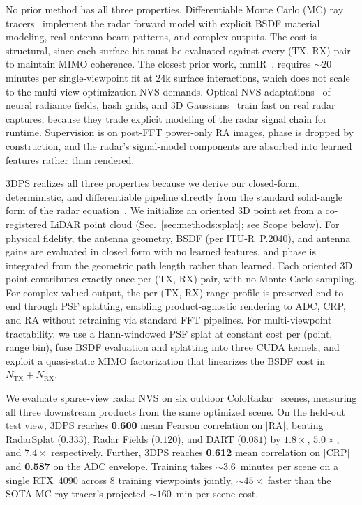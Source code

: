 No prior method has all three properties. Differentiable Monte Carlo (MC) ray tracers~\cite{sionna, hofmann2025inverse, chen2025invertwin, mmIR2026} implement the radar forward model with explicit BSDF material modeling, real antenna beam patterns, and complex outputs. The cost is structural, since each surface hit must be evaluated against every (TX, RX) pair to maintain MIMO coherence. The closest prior work, mmIR~\cite{mmIR2026}, requires ${\sim}20$ minutes per single-viewpoint fit at 24k surface interactions, which does not scale to the multi-view optimization NVS demands. Optical-NVS adaptations~\cite{huang2024dart, 10.1145/3641519.3657510, takawale2025spinr, kung2025radarsplat} of neural radiance fields, hash grids, and 3D Gaussians~\cite{mildenhall2021nerf, 3dgs} train fast on real radar captures, because they trade explicit modeling of the radar signal chain for runtime. Supervision is on post-FFT power-only RA images, phase is dropped by construction, and the radar's signal-model components are absorbed into learned features rather than rendered.

3DPS realizes all three properties because we derive our closed-form, deterministic, and differentiable pipeline directly from the standard solid-angle form of the radar equation~\cite{skolnik2001introduction, mmIR2026}. We initialize an oriented 3D point set from a co-registered LiDAR point cloud (Sec.~\ref{sec:methods:splat}; see Scope below). For physical fidelity, the antenna geometry, BSDF (per ITU-R~P.2040), and antenna gains are evaluated in closed form with no learned features, and phase is integrated from the geometric path length rather than learned. Each oriented 3D point contributes exactly once per (TX, RX) pair, with no Monte Carlo sampling. For complex-valued output, the per-(TX, RX) range profile is preserved end-to-end through PSF splatting, enabling product-agnostic rendering to ADC, CRP, and RA without retraining via standard FFT pipelines. For multi-viewpoint tractability, we use a Hann-windowed PSF splat at constant cost per (point, range bin), fuse BSDF evaluation and splatting into three CUDA kernels, and exploit a quasi-static MIMO factorization that linearizes the BSDF cost in $N_{\text{TX}} + N_{\text{RX}}$.

We evaluate sparse-view radar NVS on six outdoor ColoRadar~\cite{kramer2022coloradar} scenes, measuring all three downstream products from the same optimized scene. On the held-out test view, 3DPS reaches \textbf{0.600} mean Pearson correlation on $|\mathrm{RA}|$, beating RadarSplat ($0.333$), Radar Fields ($0.120$), and DART ($0.081$) by $1.8\times$, $5.0\times$, and $7.4\times$ respectively. Further, 3DPS reaches \textbf{0.612} mean correlation on $|\mathrm{CRP}|$ and \textbf{0.587} on the ADC envelope. Training takes ${\sim}3.6$~minutes per scene on a single RTX~4090 across 8 training viewpoints jointly, ${\sim}45\times$ faster than the SOTA MC ray tracer's projected ${\sim}160$~min per-scene cost.

